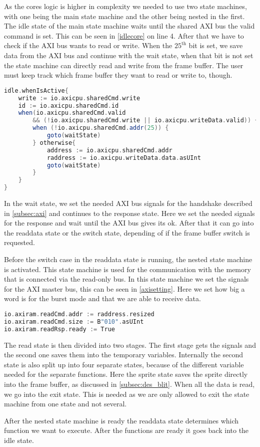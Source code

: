 As the cores logic is higher in complexity we needed to use two state machines, with one being the main state machine and the other being nested in the first. The idle state of the main state machine waits until the shared AXI bus the valid command is set. This can be seen in \cref{idlecore} on line 4. After that we have to check if the AXI bus wants to read or write. When the \(\text{25}^{\text{th}}\) bit is set, we save data from the AXI bus and continue with the wait state, when that bit is not set the state machine can directly read and write from the frame buffer. The user must keep track which frame buffer they want to read or write to, though.
\begin{lstlisting}[language=scala, caption={Idle State of the core}, label=idlecore]
idle.whenIsActive{
	write := io.axicpu.sharedCmd.write
	id := io.axicpu.sharedCmd.id
	when(io.axicpu.sharedCmd.valid 
		&& (!io.axicpu.sharedCmd.write || io.axicpu.writeData.valid)) {
		when (!io.axicpu.sharedCmd.addr(25)) {
			goto(waitState)
		} otherwise{
			address := io.axicpu.sharedCmd.addr
			raddress := io.axicpu.writeData.data.asUInt
			goto(waitState)
		}
	}
}
\end{lstlisting}
In the wait state, we set the needed AXI bus signals for the handshake described in \cref{subsec:axi} and continues to the response state. Here we set the needed signals for the response and wait until the AXI bus gives its ok. After that it can go into the readdata state or the switch state, depending of if the frame buffer switch is requested.

Before the switch case in the readdata state is running, the nested state machine is activated. This state machine is used for the communication with the memory that is connected via the read-only bus. In this state machine we set the signals for the AXI master bus, this can be seen in \cref{axisetting}. Here we set how big a word is for the burst mode and that we are able to receive data.
\begin{lstlisting}[language=scala, caption={Setting the AXI master bus signals}, label=axisetting]
io.axiram.readCmd.addr := raddress.resized
io.axiram.readCmd.size := B"010".asUInt
io.axiram.readRsp.ready := True
\end{lstlisting}
The read state is then divided into two stages. The first stage gets the signals and the second one saves them into the temporary variables. Internally the second state is also split up into four separate states, because of the different variable needed for the separate functions. Here the sprite state saves the sprite directly into the frame buffer, as discussed in \cref{subsec:des_blit}. When all the data is read, we go into the exit state. This is needed as we are only allowed to exit the state machine from one state and not several.

After the nested state machine is ready the readdata state determines which function we want to execute. After the functions are ready it goes back into the idle state.